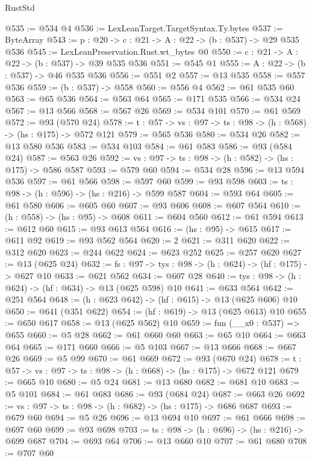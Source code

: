 \begin{lexlean}{RustStd}
\begin{coremodule}
@535 := @534 @4
@536 := LexLeanTarget.TargetSyntax.Ty.bytes
@537 := ByteArray
@543 := {p : @20} -> {c : @21} -> {A : @22} -> (b : @537) -> @29 @535 @536
@545 := LexLeanPreservation.Rust.wt_bytes @0
@550 := {c : @21} -> {A : @22} -> (b : @537) -> @39 @535 @536
@551 := @545 @1
@555 := {A : @22} -> (b : @537) -> @46 @535 @536
@556 := @551 @2
@557 := @13 @535
@558 := @557 @536
@559 := (b : @537) -> @558
@560 := @556 @4
@562 := @61 @535 @60
@563 := @65 @536
@564 := @563 @64
@565 := @171 @535
@566 := @534 @24
@567 := @13 @566
@568 := @567 @26
@569 := @534 @101
@570 := @61 @569
@572 := @93 (@570 @24)
@578 := {t : @57} -> {vs : @97} -> {ts : @98} -> (h : @568) -> (hs : @175) -> @572 @121
@579 := @565 @536
@580 := @534 @26
@582 := @13 @580 @536
@583 := @534 @103
@584 := @61 @583
@586 := @93 (@584 @24)
@587 := @563 @26
@592 := {vs : @97} -> {ts : @98} -> (h : @582) -> (hs : @175) -> @586 @587
@593 := @579 @60
@594 := @534 @28
@596 := @13 @594 @536
@597 := @61 @566
@598 := @597 @60
@599 := @93 @598
@603 := {ts : @98} -> (h : @596) -> (hs : @216) -> @599 @587
@604 := @593 @64
@605 := @61 @580
@606 := @605 @60
@607 := @93 @606
@608 := @607 @564
@610 := (h : @558) -> (hs : @95) -> @608
@611 := @604 @560
@612 := @61 @594
@613 := @612 @60
@615 := @93 @613 @564
@616 := (hs : @95) -> @615
@617 := @611 @92
@619 := @93 @562 @564
@620 := 2
@621 := @311 @620
@622 := @312 @620
@623 := @244 @622
@624 := @623 @252
@625 := @257 @620
@627 := @13 (@625 @24)
@632 := {fs : @97} -> {tys : @98} -> (h : @624) -> (hf : @175) -> @627 @10
@633 := @621 @562
@634 := @607 @28
@640 := {tys : @98} -> (h : @624) -> (hf : @634) -> @13 (@625 @598) @10
@641 := @633 @564
@642 := @251 @564
@648 := (h : @623 @642) -> (hf : @615) -> @13 (@625 @606) @10
@650 := @641 (@351 @622)
@654 := (hf : @619) -> @13 (@625 @613) @10
@655 := @650 @617
@658 := @13 (@625 @562) @10
@659 := fun (__x0 : @537) => @655
@660 := @5 @28
@662 := @61 @660 @60
@663 := @65 @10
@664 := @663 @64
@665 := @171 @660
@666 := @5 @103
@667 := @13 @666
@668 := @667 @26
@669 := @5 @99
@670 := @61 @669
@672 := @93 (@670 @24)
@678 := {t : @57} -> {vs : @97} -> {ts : @98} -> (h : @668) -> (hs : @175) -> @672 @121
@679 := @665 @10
@680 := @5 @24
@681 := @13 @680
@682 := @681 @10
@683 := @5 @101
@684 := @61 @683
@686 := @93 (@684 @24)
@687 := @663 @26
@692 := {vs : @97} -> {ts : @98} -> (h : @682) -> (hs : @175) -> @686 @687
@693 := @679 @60
@694 := @5 @26
@696 := @13 @694 @10
@697 := @61 @666
@698 := @697 @60
@699 := @93 @698
@703 := {ts : @98} -> (h : @696) -> (hs : @216) -> @699 @687
@704 := @693 @64
@706 := @13 @660 @10
@707 := @61 @680
@708 := @707 @60

\end{coremodule}
\end{lexlean}
